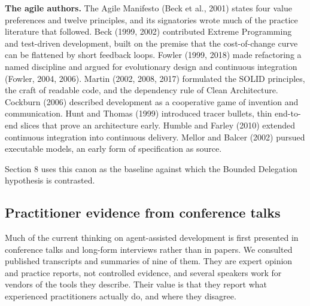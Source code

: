 \documentclass[11pt]{article}
\begin{document}
\textbf{The agile authors.} The Agile Manifesto (Beck et al., 2001) states four value preferences and twelve principles, and its signatories wrote much of the practice literature that followed. Beck (1999, 2002) contributed Extreme Programming and test-driven development, built on the premise that the cost-of-change curve can be flattened by short feedback loops. Fowler (1999, 2018) made refactoring a named discipline and argued for evolutionary design and continuous integration (Fowler, 2004, 2006). Martin (2002, 2008, 2017) formulated the SOLID principles, the craft of readable code, and the dependency rule of Clean Architecture. Cockburn (2006) described development as a cooperative game of invention and communication. Hunt and Thomas (1999) introduced tracer bullets, thin end-to-end slices that prove an architecture early. Humble and Farley (2010) extended continuous integration into continuous delivery. Mellor and Balcer (2002) pursued executable models, an early form of specification as source.

Section 8 uses this canon as the baseline against which the Bounded Delegation hypothesis is contrasted.

\subsection{Practitioner evidence from conference talks}

Much of the current thinking on agent-assisted development is first presented in conference talks and long-form interviews rather than in papers. We consulted published transcripts and summaries of nine of them. They are expert opinion and practice reports, not controlled evidence, and several speakers work for vendors of the tools they describe. Their value is that they report what experienced practitioners actually do, and where they disagree.
\end{document}
